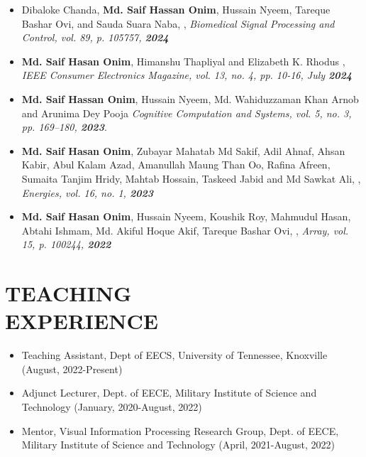 \documentclass[margin]{res}
\begin{document}
\begin{resume}
\begin{itemize}
\item Dibaloke Chanda, \textbf{Md. Saif Hassan Onim}, Hussain Nyeem, Tareque Bashar Ovi, and Sauda Suara Naba, , \textit{Biomedical Signal Processing and Control, vol. 89, p. 105757, \textbf{2024}}

\item \textbf{Md. Saif Hasan Onim}, Himanshu Thapliyal and Elizabeth K. Rhodus , \textit{IEEE Consumer Electronics Magazine, vol. 13, no. 4, pp. 10-16, July \textbf{2024}}

\item \textbf{Md. Saif Hassan Onim}, Hussain Nyeem, Md. Wahiduzzaman Khan Arnob and Arunima Dey Pooja  \textit{Cognitive Computation and Systems, vol. 5, no. 3, pp. 169–180, \textbf{2023}}.

\item \textbf{Md. Saif Hasan Onim}, Zubayar Mahatab Md Sakif, Adil Ahnaf, Ahsan Kabir, Abul Kalam Azad, Amanullah Maung Than Oo, Rafina Afreen, Sumaita Tanjim Hridy, Mahtab Hossain, Taskeed Jabid and Md Sawkat Ali, , \textit{Energies, vol. 16, no. 1, \textbf{2023}}


\item \textbf{Md. Saif Hasan Onim}, Hussain Nyeem, Koushik Roy, Mahmudul Hasan, Abtahi Ishmam, Md. Akiful Hoque Akif, Tareque Bashar Ovi, , \textit{Array, vol. 15, p. 100244, \textbf{2022}}

\end{itemize}

\section{TEACHING \\ EXPERIENCE}
\begin{itemize}
\item Teaching Assistant, Dept of EECS, University of Tennessee, Knoxville (August, 2022-Present)
\item Adjunct Lecturer, Dept. of EECE, Military Institute of Science and Technology (January, 2020-August, 2022)
\item Mentor, Visual Information Processing Research Group, Dept. of EECE, Military Institute of Science and Technology (April, 2021-August, 2022)


\end{itemize}
\end{resume}
\end{document}
